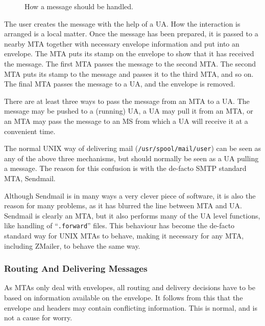 \begin{figure}[ht]
  \centering
  \caption{\label{fig:msgrout}How a message should be handled.}
\end{figure}

The user creates the message with the help of a UA. How the interaction 
is arranged is a local matter. Once the message has been prepared, 
it is passed to a nearby MTA together with necessary envelope 
information and put into an envelope. The MTA puts its stamp on 
the envelope to show that it has received the message. The first 
MTA passes the message to the second MTA. The second MTA puts its 
stamp to the message and passes it to the third MTA, and so on. 
The final MTA passes the message to a UA, and the envelope is removed.

There are at least three ways to pass the message from an MTA to a UA. 
The message may be pushed to a (running) UA, a UA may pull it from an MTA, 
or an MTA may pass the message to an MS from which a UA will receive it at 
a convenient time.

The normal UNIX way of delivering mail ({\tt /usr/spool/mail/user})
can be seen as any of the above three mechanisms, but should normally
be seen as a UA pulling a message. The reason for this confusion is
with the de-facto SMTP standard MTA, Sendmail.

Although Sendmail is in many ways a very clever piece of software,
it is also the reason for many problems, as it has blurred the line
between MTA and UA. Sendmail is clearly an MTA, but it also performs
many of the UA level functions, like handling of ``{\tt .forward}''
files.  This behaviour has become the de-facto standard  way for UNIX
MTAs to behave, making it necessary for any MTA, including ZMailer,
to behave the same way.


\subsubsection{Routing And Delivering Messages}


As MTAs only deal with envelopes, all routing and delivery decisions have to be
based on information available on the envelope. It follows from this that 
the envelope and headers may contain conflicting information. This is normal, 
and is not a cause for worry.

